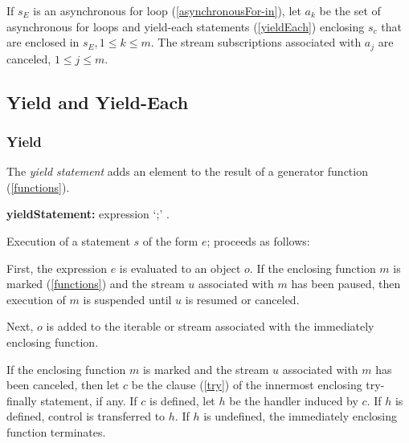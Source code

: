 \documentclass{article}
\newcommand{\code}[1]{{\sf #1}}
\begin{document}
 
\LMHash{}
 If $s_E$ is an asynchronous for loop (\ref{asynchronousFor-in}), let $a_k$ be the set of asynchronous for loops and yield-each statements (\ref{yieldEach}) enclosing $s_c$ that are enclosed in $s_E , 1 \le k \le m$.   The stream subscriptions associated with $a_j$ are canceled, $1 \le j \le m$. 
 
 \subsection{ Yield and Yield-Each}
 
 \subsubsection{ Yield}
 
\LMHash{}
 The {\em yield statement} adds an element to the result of a generator function (\ref{functions}).

 \begin{grammar}
{\bf yieldStatement:}
   \YIELD{} expression `{\escapegrammar ;}'
      .
\end{grammar}

\LMHash{}
Execution of a statement $s$ of the form \code{\YIELD{} $e$;}  proceeds as follows:

\LMHash{}
First, the expression $e$ is evaluated to an object $o$. If the enclosing function $m$ is marked \ASYNC* (\ref{functions}) and the stream $u$ associated with $m$ has been paused,  then execution of $m$ is suspended until $u$ is resumed or canceled.

\LMHash{}
Next, $o$ is added to the iterable or stream associated with the immediately enclosing function. 

\LMHash{}
If the enclosing function $m$ is marked \ASYNC* and the stream $u$ associated with $m$ has been canceled, then let $c$ be the \FINALLY{} clause (\ref{try}) of the innermost enclosing try-finally statement, if any. If $c$ is defined, let $h$ be the handler induced by $c$. If $h$ is defined, control is transferred to $h$. If $h$ is undefined, the immediately enclosing function terminates.

\end{document}
